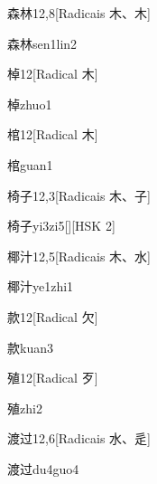 \begin{entry}{森林}{12,8}[Radicais ⽊、⽊]
  \begin{phonetics}{森林}{sen1lin2}
  \end{phonetics}
\end{entry}

\begin{entry}{棹}{12}[Radical ⽊]
  \begin{phonetics}{棹}{zhuo1}
  \end{phonetics}
\end{entry}

\begin{entry}{棺}{12}[Radical ⽊]
  \begin{phonetics}{棺}{guan1}
  \end{phonetics}
\end{entry}

\begin{entry}{椅子}{12,3}[Radicais ⽊、⼦]
  \begin{phonetics}{椅子}{yi3zi5}[][HSK 2]
  \end{phonetics}
\end{entry}

\begin{entry}{椰汁}{12,5}[Radicais ⽊、⽔]
  \begin{phonetics}{椰汁}{ye1zhi1}
  \end{phonetics}
\end{entry}

\begin{entry}{款}{12}[Radical ⽋]
  \begin{phonetics}{款}{kuan3}
  \end{phonetics}
\end{entry}

\begin{entry}{殖}{12}[Radical ⽍]
  \begin{phonetics}{殖}{zhi2}
  \end{phonetics}
\end{entry}

\begin{entry}{渡过}{12,6}[Radicais ⽔、⾡]
  \begin{phonetics}{渡过}{du4guo4}
  \end{phonetics}
\end{entry}


